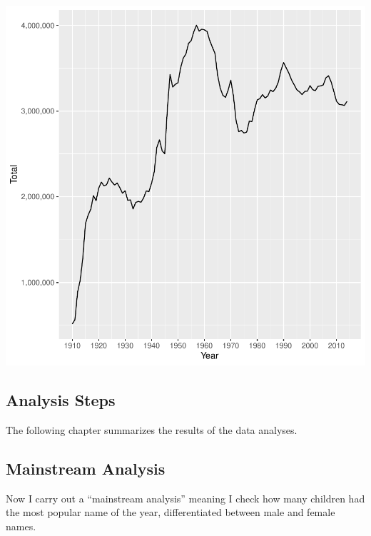 \documentclass[11pt,preprint]{elsarticle}
\let\origfigure\figure
\let\endorigfigure\endfigure
\renewenvironment{figure}[1][2] {
    \expandafter\origfigure\expandafter[H]
} {
    \endorigfigure
}
\numberwithin{equation}{section}
\numberwithin{figure}{section}
\numberwithin{table}{section}
\begin{document}
\begin{figure}[H]

{\centering \includegraphics{Task_1_ReadMe_files/figure-latex/name-count-1} 

}

\caption{Annual Count of Unique Baby Names in the U.S., 1910-2014}\label{fig:name-count}
\end{figure}

\subsection{Analysis Steps}\label{analysis-steps}

The following chapter summarizes the results of the data analyses.

\subsection{Mainstream Analysis}\label{mainstream-analysis}

Now I carry out a ``mainstream analysis'' meaning I check how many
children had the most popular name of the year, differentiated between
male and female names.
\end{document}
